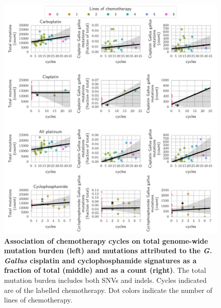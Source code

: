 \documentclass{article}
\begin{document}
\begin{figure}
\centering
\includegraphics[scale=1.0]{../figures/chemo_cycles_and_mutations.pdf}
\caption{\textbf{Association of chemotherapy cycles on total genome-wide mutation burden (left) and mutations attributed to the \textit{G. Gallus} cisplatin and cyclophosphamide signatures as a fraction of total (middle) and as a count (right)}. The total mutation burden includes both SNVs and indels. Cycles indicated are of the labelled chemotherapy. Dot colors indicate the number of lines of chemotherapy.}
\label{fig:supp_chemo_cycles_and_mutations}
\end{figure}
\end{document}
